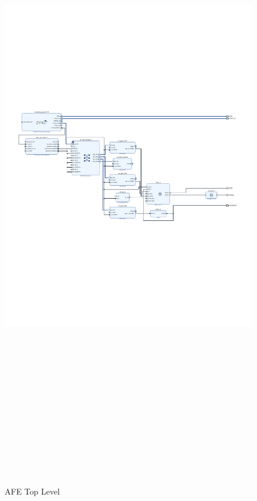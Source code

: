 \begin{landscape}
	\begin{figure}[htbp]
		\centering
		\includegraphics[width=20cm,height=28.7cm,keepaspectratio]{Figures/appendix/fpga/design_1.pdf}
		\caption{AFE Top Level}
		\label{fig:app_fpga_block_diagram}
	\end{figure}
\end{landscape}
